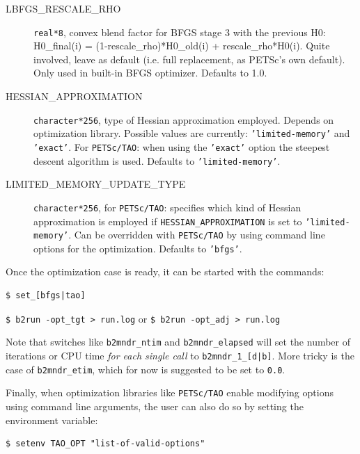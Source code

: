 \begin{description}
  \item[LBFGS\_RESCALE\_RHO] {\tt real*8}, convex blend factor for BFGS stage 3 with the previous H0: H0\_final(i) = (1-rescale\_rho)*H0\_old(i) + rescale\_rho*H0(i). Quite involved, leave as default (i.e. full replacement, as PETSc's own default). Only used in built-in BFGS optimizer. Defaults to 1.0. 
  \item[HESSIAN\_APPROXIMATION] {\tt character*256}, type of Hessian approximation employed. Depends on optimization library. Possible values are currently: {\tt 'limited-memory'} and {\tt 'exact'}. For {\tt PETSc/TAO}: when using the {\tt 'exact'} option the steepest descent algorithm is used. Defaults to {\tt 'limited-memory'}.
  \item[LIMITED\_MEMORY\_UPDATE\_TYPE] {\tt character*256}, for {\tt PETSc/TAO}: specifies which kind of Hessian approximation is employed if {\tt HESSIAN\_APPROXIMATION} is set to {\tt 'limited-memory'}. Can be overridden with {\tt PETSc/TAO} by using command line options for the optimization. Defaults to {\tt 'bfgs'}.
\end{description}

Once the optimization case is ready, it can be started with the commands:
\begin{verbatim}
$ set_[bfgs|tao]
\end{verbatim}
\verb|$ b2run -opt_tgt > run.log| or \verb|$ b2run -opt_adj > run.log|

Note that switches like {\tt b2mndr\_ntim} and {\tt b2mndr\_elapsed} will set the number of iterations or CPU time {\em for each single call} to {\tt b2mndr\_1\_[d|b]}. More tricky is the case of {\tt b2mndr\_etim}, which for now is suggested to be set to {\tt 0.0}.

Finally, when optimization libraries like {\tt PETSc/TAO} enable modifying options using command line arguments, the user can also do so by setting the environment variable:
\begin{verbatim}
$ setenv TAO_OPT "list-of-valid-options"
\end{verbatim}

